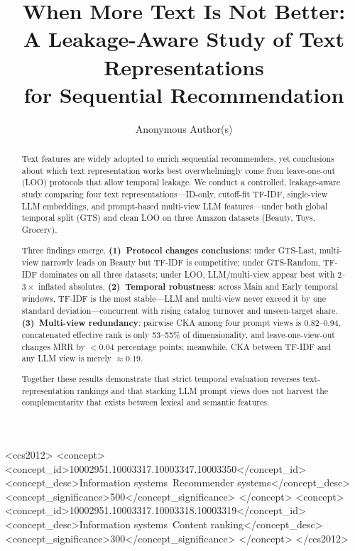 \documentclass[sigconf,natbib=true,anonymous]{acmart}
\newcommand{\tfidf}{\textsc{TF-IDF}\xspace}
\newcommand{\llm}{\textsc{LLM}\xspace}
\begin{document}
\title{When More Text Is Not Better:\\
A Leakage-Aware Study of Text Representations\\
for Sequential Recommendation}

\author{Anonymous Author(s)}
\renewcommand{\shortauthors}{Anonymous}

\begin{abstract}
Text features are widely adopted to enrich sequential recommenders, yet conclusions about which text representation works best overwhelmingly come from leave-one-out (LOO) protocols that allow temporal leakage.
We conduct a controlled, leakage-aware study comparing four text representations---ID-only, cutoff-fit \tfidf, single-view \llm embeddings, and prompt-based multi-view \llm features---under both global temporal split (GTS) and clean LOO on three Amazon datasets (Beauty, Toys, Grocery).

Three findings emerge.
\textbf{(1)~Protocol changes conclusions}: under GTS-Last, multi-view narrowly leads on Beauty but \tfidf is competitive; under GTS-Random, \tfidf dominates on all three datasets; under LOO, \llm/multi-view appear best with $2$--$3\times$ inflated absolutes.
\textbf{(2)~Temporal robustness}: across Main and Early temporal windows, \tfidf is the most stable---\llm and multi-view never exceed it by one standard deviation---concurrent with rising catalog turnover and unseen-target share.
\textbf{(3)~Multi-view redundancy}: pairwise CKA among four prompt views is 0.82--0.94, concatenated effective rank is only 53--55\% of dimensionality, and leave-one-view-out changes MRR by $<$0.04 percentage points; meanwhile, CKA between \tfidf and any \llm view is merely $\approx$0.19.

Together these results demonstrate that strict temporal evaluation reverses text-representation rankings and that stacking LLM prompt views does not harvest the complementarity that exists between lexical and semantic features.
\end{abstract}

\begin{CCSXML}
<ccs2012>
 <concept>
  <concept_id>10002951.10003317.10003347.10003350</concept_id>
  <concept_desc>Information systems~Recommender systems</concept_desc>
  <concept_significance>500</concept_significance>
 </concept>
 <concept>
  <concept_id>10002951.10003317.10003318.10003319</concept_id>
  <concept_desc>Information systems~Content ranking</concept_desc>
  <concept_significance>300</concept_significance>
 </concept>
</ccs2012>
\end{CCSXML}
\end{document}
